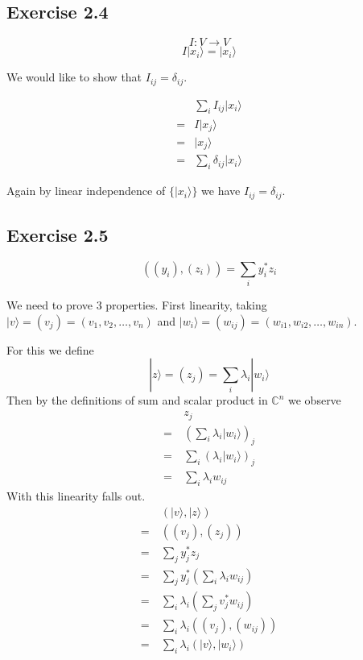 \documentclass[]{article}
\begin{document}
\subsection{Exercise 2.4}

\[I: V \to V\]
\[I|x_i\rangle = |x_i\rangle\]

We would like to show that $I_{ij} = \delta_{ij}$.

\begin{align*}
&\sum_i I_{ij} |x_i\rangle \\
= &I|x_j\rangle \\
= &|x_j\rangle \\
= &\sum_i \delta_{ij}|x_i\rangle
\end{align*}

Again by linear independence of $\{|x_i\rangle\}$ we have $I_{ij} = \delta_{ij}$.

\subsection{Exercise 2.5}

\[((y_i), (z_i)) = \sum_i y_i^*z_i\]

We need to prove 3 properties. First linearity, taking $|v\rangle = (v_j) = (v_1, v_2, \ldots, v_n)$ and $|w_i\rangle = (w_{ij}) = (w_{i1}, w_{i2}, \ldots, w_{in})$.

For this we define
\[|z\rangle = (z_j) = \sum_i\lambda_i|w_i\rangle\]
Then by the definitions of sum and scalar product in $\mathbb{C}^n$ we observe
\begin{align*}
&z_j \\
=\ &\left(\sum_i\lambda_i|w_i\rangle\right)_j \\
=\ &\sum_i\left(\lambda_i|w_i\rangle\right)_j \\
=\ &\sum_i\lambda_iw_{ij}
\end{align*}
With this linearity falls out.
\begin{align*}
&\left(|v\rangle, |z\rangle\right) \\
=\ &\left((v_j), (z_j)\right) \\
=\ &\sum_j y_j^*z_j \\
=\ &\sum_j y_j^*\left(\sum_i\lambda_iw_{ij}\right) \\
=\ &\sum_i\lambda_i\left(\sum_jv_j^*w_{ij}\right) \\
=\ &\sum_i\lambda_i\left((v_j), (w_{ij})\right) \\
=\ &\sum_i\lambda_i\left(|v\rangle, |w_i\rangle\right)
\end{align*}
\end{document}
